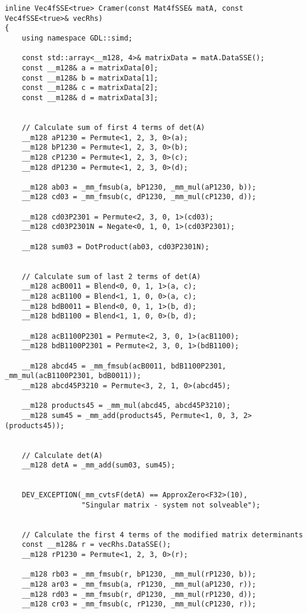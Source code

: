 \begin{verbatim}
inline Vec4fSSE<true> Cramer(const Mat4fSSE& matA, const Vec4fSSE<true>& vecRhs)
{
    using namespace GDL::simd;

    const std::array<__m128, 4>& matrixData = matA.DataSSE();
    const __m128& a = matrixData[0];
    const __m128& b = matrixData[1];
    const __m128& c = matrixData[2];
    const __m128& d = matrixData[3];


    // Calculate sum of first 4 terms of det(A)
    __m128 aP1230 = Permute<1, 2, 3, 0>(a);
    __m128 bP1230 = Permute<1, 2, 3, 0>(b);
    __m128 cP1230 = Permute<1, 2, 3, 0>(c);
    __m128 dP1230 = Permute<1, 2, 3, 0>(d);

    __m128 ab03 = _mm_fmsub(a, bP1230, _mm_mul(aP1230, b));
    __m128 cd03 = _mm_fmsub(c, dP1230, _mm_mul(cP1230, d));

    __m128 cd03P2301 = Permute<2, 3, 0, 1>(cd03);
    __m128 cd03P2301N = Negate<0, 1, 0, 1>(cd03P2301);

    __m128 sum03 = DotProduct(ab03, cd03P2301N);


    // Calculate sum of last 2 terms of det(A)
    __m128 acB0011 = Blend<0, 0, 1, 1>(a, c);
    __m128 acB1100 = Blend<1, 1, 0, 0>(a, c);
    __m128 bdB0011 = Blend<0, 0, 1, 1>(b, d);
    __m128 bdB1100 = Blend<1, 1, 0, 0>(b, d);

    __m128 acB1100P2301 = Permute<2, 3, 0, 1>(acB1100);
    __m128 bdB1100P2301 = Permute<2, 3, 0, 1>(bdB1100);

    __m128 abcd45 = _mm_fmsub(acB0011, bdB1100P2301, _mm_mul(acB1100P2301, bdB0011));
    __m128 abcd45P3210 = Permute<3, 2, 1, 0>(abcd45);

    __m128 products45 = _mm_mul(abcd45, abcd45P3210);
    __m128 sum45 = _mm_add(products45, Permute<1, 0, 3, 2>(products45));


    // Calculate det(A)
    __m128 detA = _mm_add(sum03, sum45);


    DEV_EXCEPTION(_mm_cvtsF(detA) == ApproxZero<F32>(10), 
                  "Singular matrix - system not solveable");


    // Calculate the first 4 terms of the modified matrix determinants
    const __m128& r = vecRhs.DataSSE();
    __m128 rP1230 = Permute<1, 2, 3, 0>(r);

    __m128 rb03 = _mm_fmsub(r, bP1230, _mm_mul(rP1230, b));
    __m128 ar03 = _mm_fmsub(a, rP1230, _mm_mul(aP1230, r));
    __m128 rd03 = _mm_fmsub(r, dP1230, _mm_mul(rP1230, d));
    __m128 cr03 = _mm_fmsub(c, rP1230, _mm_mul(cP1230, r));


\end{verbatim}
